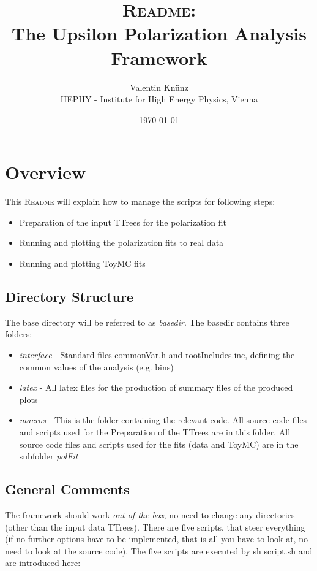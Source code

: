 \documentclass{article}
\begin{document}
\title{\textsc{Readme}:\\The Upsilon Polarization Analysis Framework}
\author{Valentin Kn\"unz\\HEPHY - Institute for High Energy Physics, Vienna}
\date{\today}
\maketitle  


\tableofcontents
\newpage


\section{Overview}

This \textsc{Readme} will explain how to manage the scripts for following steps:
\begin{itemize}
\item{Preparation of the input TTrees for the polarization fit}
\item{Running and plotting the polarization fits to real data}
\item{Running and plotting ToyMC fits}
\end{itemize}

\subsection{Directory Structure}
The base directory will be referred to as \emph{basedir}. The basedir contains three folders:
\begin{itemize}
\item{\emph{interface} - Standard files commonVar.h and rootIncludes.inc, defining the common values of the analysis (e.g. bins)}
\item{\emph{latex} - All latex files for the production of summary files of the produced plots}
\item{\emph{macros} - This is the folder containing the relevant code. All source code files and scripts used for the Preparation of the TTrees are in this folder. All source code files and scripts used for the fits (data and ToyMC) are in the subfolder \emph{polFit}}
\end{itemize}

\subsection{General Comments}

The framework should work \emph{out of the box}, no need to change any directories (other than the input data TTrees). There are five scripts, that steer everything (if no further options have to be implemented, that is all you have to look at, no need to look at the source code). The five scripts are executed by sh script.sh and are introduced here:
\end{document}
